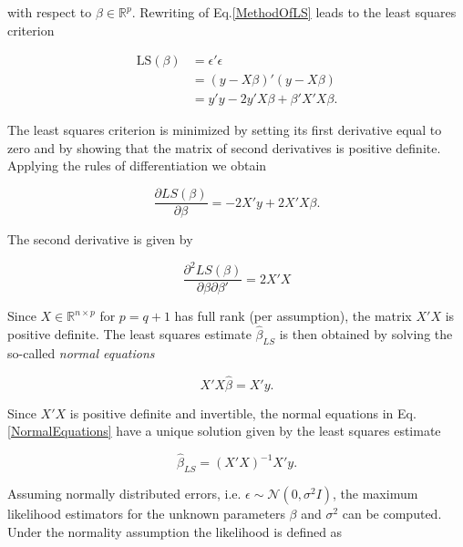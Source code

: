 with respect to $\beta \in \mathbb{R}^p$. Rewriting of Eq.\ref{MethodOfLS} leads to the least squares criterion

\begin{equation*}
\begin{split}
\text{LS}(\beta) &= \epsilon'\epsilon \\ 
				 &= (y - X\beta)'(y - X\beta) \\ 
				 &= y'y - 2y'X\beta + \beta'X'X\beta.
\end{split}
\end{equation*}

The least squares criterion is minimized by setting its first derivative equal to zero and by showing that the matrix of second derivatives is positive definite. Applying the rules of differentiation we obtain

\begin{equation*}
\frac{\partial LS(\beta)}{\partial \beta} = -2X' y + 2X'X\beta.
\end{equation*}

The second derivative is given by

\begin{equation*}
\frac{\partial^2LS(\beta)}{\partial\beta \partial \beta'} = 2X'X
\end{equation*}
	
Since $X \in \mathbb{R}^{n \times p}$ for $p = q + 1$ has full rank (per assumption), the matrix $X'X$ is positive definite. The least squares estimate $\hat \beta_{LS}$ is then obtained by solving the so-called \emph{normal equations}

\begin{equation} \label{NormalEquations}
X'X \hat \beta = X'y.
\end{equation}


Since $X'X$ is positive definite and invertible, the normal equations in Eq.\ref{NormalEquations} have a unique solution given by the least squares estimate

\begin{equation} \label{LS_estimator}
\hat \beta_{LS} = (X'X)^{-1}X'y.
\end{equation}


Assuming normally distributed errors, i.e. $\epsilon \sim \mathcal N(0, \sigma^2I)$, the maximum likelihood estimators for the unknown parameters $\beta$ and $\sigma^2$ can be computed. Under the normality assumption the likelihood is defined as

